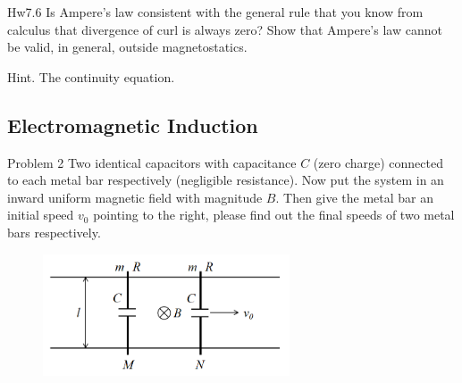 \documentclass{beamer}
\begin{document}
\begin{frame}{Hw7.6}
Is Ampere’s law consistent with the general rule that you know from calculus that divergence of curl is always zero? Show that Ampere’s law cannot be valid, in general, outside magnetostatics.

Hint. The continuity equation.

\end{frame}

\subsection{Electromagnetic Induction}

\begin{frame}{Problem 2}
    Two identical capacitors with capacitance $C$ (zero charge) connected to each metal bar respectively (negligible resistance). Now put the system in an inward uniform magnetic field with magnitude $B$. Then give the metal bar an initial speed $v_{0}$ pointing to the right, please find out the final speeds of two metal bars respectively. 

\begin{figure}[H]
 \centering
 \includegraphics[width=0.65\textwidth]{images/010.png}
\end{figure}
    
\end{frame}
\end{document}

